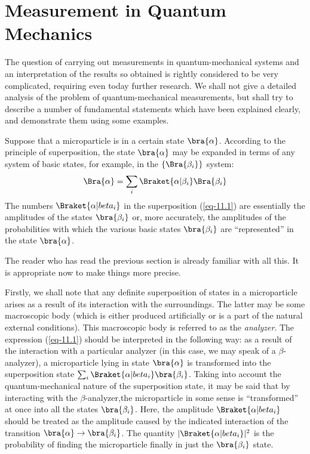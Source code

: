 \documentclass[a4paper,sfsidenotes,colorlinks=true]{tufte-book}
\numberwithin{equation}{section}
\numberwithin{figure}{section}
\begin{document}
\section{Measurement in Quantum Mechanics}
\label{sec-11}
The question of carrying out measurements in quantum-mechanical
systems and an interpretation of the results so obtained is rightly
considered to be very complicated, requiring even today further
research. We shall not give a detailed analysis of the problem of
quantum-mechanical measurements, but shall try to describe a number of
fundamental statements which have been explained clearly, and
demonstrate them using some examples.

Suppose  that a microparticle is in a
certain state $\bra{\alpha}$. According to the principle of superposition, the
state $\bra{\alpha}$ may be expanded in terms of any system of basic states,
for example, in the $\left\{ \Bra{\beta_{i}}\right\}$ system:
\begin{equation}%
\Bra{\alpha} = \sum_{i} \Braket{\alpha | \beta_{i}} \Bra{\beta_{i}}
\label{eq-11.1}
\end{equation}
The numbers $\Braket{\alpha | beta_{i}}$ in the superposition
(\ref{eq-11.1}) are essentially the amplitudes of the states
$\bra{\beta_{i}}$ or, more accurately, the amplitudes of the
probabilities with which the various basic states $\bra{\beta_{i}}$
are ``represented'' in the state $\bra{\alpha}$.

The reader who has read the previous section is already
familiar with all this. It is appropriate now to make things more
precise. 

Firstly, we shall note that any definite superposition of states in a
microparticle arises as a result of its interaction with the
surroundings. The latter may be some macroscopic body (which is either
produced artificially or is a part of the natural external
conditions). This macroscopic body is referred to as the
\emph{analyzer}. The expression (\ref{eq-11.1}) should be interpreted
in the following way: as a result of the interaction with a particular
analyzer (in this case, we may speak of a $\beta$-analyzer), a
microparticle lying in state $\bra{\alpha}$ is transformed into the
superposition state $\sum_{i} \Braket{\alpha | beta_{i}}
\bra{\beta_{i}}$. Taking into account the quantum-mechanical nature of
the superposition state, it may be said that by interacting with the
$\beta$-analyzer,the microparticle in some sense is ``transformed'' at
once into all the states $\bra{\beta_{i}}$. Here, the amplitude $
\Braket{\alpha | beta_{i}} $ should be treated as the amplitude caused
by the indicated interaction of the transition $\bra{\alpha} \to
\bra{\beta_{i}}$. The quantity $ |\Braket{\alpha | beta_{i}}|^{2}$ is
the probability of finding the microparticle finally in just the $\bra{\beta_{i}}$
state.
\end{document}

